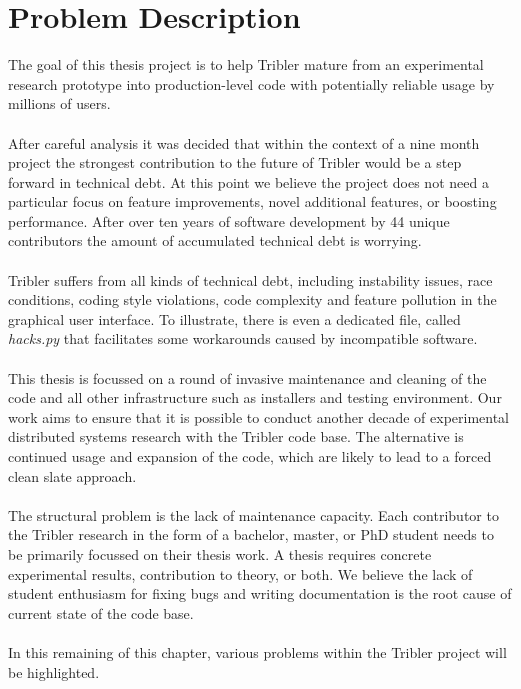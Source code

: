 \label{chapter:problem-description}
\chapter{Problem Description}

The goal of this thesis project is to help Tribler mature from an experimental research prototype into production-level code with potentially reliable usage by millions of users.\\\\
After careful analysis it was decided that within the context of a nine month project the strongest contribution to the future of Tribler would be a step forward in technical debt. At this point we believe the project does not need a particular focus on feature improvements, novel additional features, or boosting performance. After over ten years of software development by 44 unique contributors the amount of accumulated technical debt is worrying.\\\\
Tribler suffers from all kinds of technical debt, including instability issues, race conditions, coding style violations, code complexity and feature pollution in the graphical user interface. To illustrate, there is even a dedicated file, called \emph{hacks.py} that facilitates some workarounds caused by incompatible software.\\\\
This thesis is focussed on a round of invasive maintenance and cleaning of the code and all other infrastructure such as installers and testing environment. Our work aims to ensure that it is possible to conduct another decade of experimental distributed systems research with the Tribler code base. The alternative is continued usage and expansion of the code, which are likely to lead to a forced clean slate approach.\\\\
The structural problem is the lack of maintenance capacity. Each contributor to the Tribler research in the form of a bachelor, master, or PhD student needs to be primarily focussed on their thesis work. A thesis requires concrete experimental results, contribution to theory, or both. We believe the lack of student enthusiasm for fixing bugs and writing documentation is the root cause of current state of the code base.\\\\
In this remaining of this chapter, various problems within the Tribler project will be highlighted.

